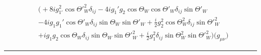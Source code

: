 \begin{align} 
 &\Big(+8 i g_{1'}^{2} \cos{\Theta'}_{W }^{2} \delta_{i j} -4 i g_1' g_2 \cos\Theta_W  \cos{\Theta'}_W  \delta_{i j} \sin{\Theta'}_W  \nonumber \\ 
 &-4 i g_1 g_1' \cos{\Theta'}_W  \delta_{i j} \sin\Theta_W  \sin{\Theta'}_W  +\frac{i}{2} g_{2}^{2} \cos\Theta_{W }^{2} \delta_{i j} \sin{\Theta'}_{W }^{2} \nonumber \\ 
 &+i g_1 g_2 \cos\Theta_W  \delta_{i j} \sin\Theta_W  \sin{\Theta'}_{W }^{2} +\frac{i}{2} g_{1}^{2} \delta_{i j} \sin\Theta_{W }^{2} \sin{\Theta'}_{W }^{2} \Big)\Big(g_{\mu \nu}\Big)\end{align} 
\hrule 
